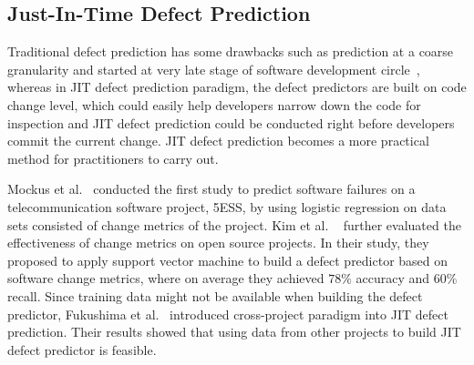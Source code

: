 \documentclass[sigconf]{acmart}
\theoremstyle{break}
\begin{document}
\subsection{Just-In-Time Defect Prediction}
Traditional defect prediction has some drawbacks such as prediction at a coarse granularity and started at very late stage of software development circle~\cite{kamei2013large}, whereas in JIT defect prediction paradigm, the defect predictors are built on code change level, which could easily help developers  narrow down the code for inspection and JIT defect prediction could be conducted right before developers commit the current change. JIT defect prediction becomes a more practical method for practitioners to carry out.

Mockus et al.~\cite{mockus2000predicting} conducted the first study to predict 
software failures on a telecommunication software project, 5ESS,
by using logistic regression on 
data sets consisted of change metrics of the project. Kim et al. ~\cite{kim2008classifying}
further evaluated the effectiveness of change metrics on open source projects. In their study, they proposed to apply support vector machine to build a defect predictor based on software change metrics, where on average they achieved $78\%$ accuracy and $60\%$ recall. Since training data might
not be available when building the defect predictor, Fukushima et al.~\cite{fukushima2014empirical} introduced cross-project paradigm into JIT defect prediction. Their results showed that using data from other projects to build JIT defect predictor is feasible. 
\end{document}
